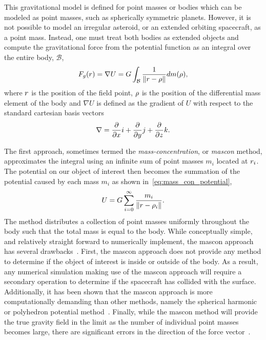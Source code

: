 This gravitational model is defined for point masses or bodies which can be modeled as point masses, such as spherically symmetric planets.
However, it is not possible to model an irregular asteroid, or an extended orbiting spacecraft, as a point mass.
Instead, one must treat both bodies as extended objects and compute the gravitational force from the potential function as an integral over the entire body, \( \mathcal{B}\),
\begin{align}\label{eq:volume_integral_potential}
    F_g ( r) = \nabla U = G \int_{\mathcal{B}} \frac{1}{\left\| r - \rho  \right\|} dm (\rho),
\end{align}
where \( r \) is the position of the field point, \( \rho \) is the position of the differential mass element of the body and \( \nabla U \) is defined as the gradient of \( U \) with respect to the standard cartesian basis vectors
\begin{align*}
    \nabla = \frac{\partial }{\partial x} i + \frac{\partial }{\partial y} j + \frac{\partial }{\partial z} k.
\end{align*}

The first approach, sometimes termed the \textit{mass-concentration}, or \textit{mascon} method, approximates the integral using an infinite sum of point masses \( m_i\) located at \( r_i \).
The potential on our object of interest then becomes the summation of the potential caused by each mass \( m_i \) as shown in~\cref{eq:mass_con_potential},
\begin{align}\label{eq:mass_con_potential}
    U = G \sum_{i=0}^{\infty} \frac{m_i}{\left\| r - \rho_i \right\|}.
\end{align}
The method distributes a collection of point masses uniformly throughout the body such that the total mass is equal to the body.
While conceptually simple, and relatively straight forward to numerically implement, the mascon approach has several drawbacks~\cite{scheeres2012a}.
First, the mascon approach does not provide any method to determine if the object of interest is inside or outside of the body.
As a result, any numerical simulation making use of the mascon approach will require a secondary operation to determine if the spacecraft has collided with the surface.
Additionally, it has been shown that the mascon approach is more computationally demanding than other methods, namely the spherical harmonic or polyhedron potential method~\cite{werner1996}.
Finally, while the mascon method will provide the true gravity field in the limit as the number of individual point masses becomes large, there are significant errors in the direction of the force vector~\cite{werner1996}.

